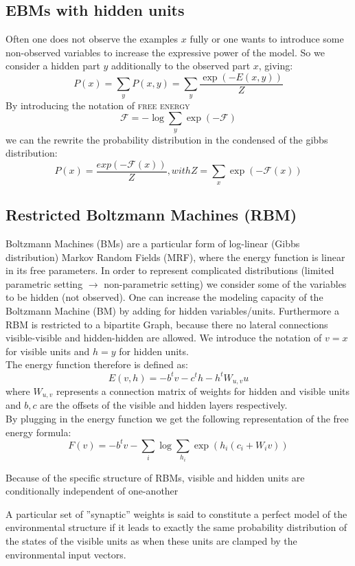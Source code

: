 \documentclass[11pt]{article}
\begin{document}
\subsection{EBMs with hidden units}
Often one does not observe the examples $x$ fully or one wants to introduce some non-observed variables to increase the expressive power of the model. So we consider a hidden part $y$ additionally to the observed part $x$, giving:
\[ 
	P(x) = \sum_y P(x,y) = \sum_y \frac{\exp(-E(x,y))}{Z}
\]
By introducing the notation of \textsc{free energy}
\[
	\mathcal{F}= -\log\sum_y \exp(-\mathcal{F})
\]
we can the rewrite the probability distribution in the condensed of the gibbs distribution:
\[
	P(x)=\frac{exp(-\mathcal{F}(x))}{Z}, with Z=\sum_x \exp(-\mathcal{F}(x))
\]

\subsection{Restricted Boltzmann Machines (RBM)}
Boltzmann Machines (BMs) are a particular form of log-linear (Gibbs distribution) Markov Random Fields (MRF), where the energy function is linear in its free parameters. In order to represent complicated distributions (limited parametric setting $\rightarrow$ non-parametric setting) we consider some of the variables to be hidden (not observed). One can increase the modeling capacity of the Boltzmann Machine (BM) by adding for hidden variables/units. Furthermore a RBM is restricted to a bipartite Graph, because there no lateral connections visible-visible and hidden-hidden are allowed. We introduce the notation of $v=x$ for visible units and $h=y$ for hidden units.\\
The energy function therefore is defined as:
\[
	E(v,h)=-b^{t}v-c^{t}h-h^{t}W_{u,v}u
\]
where $W_{u,v}$ represents a connection matrix of weights for hidden and visible units and $b,c$ are the offsets of the visible and hidden layers respectively.\\
By plugging in the energy function we get the following representation of the free energy formula:\\
\[
	F(v)=-b^{t}v-\sum_i\log\sum_{h_i} \exp(h_i(c_i+W_iv))
\]

Because of the specific structure of RBMs, visible and hidden units are conditionally independent of one-another 

A particular set of ''synaptic'' weights is said to constitute a perfect model of the environmental structure if it leads to exactly the same probability distribution of the states of the visible units as when these units are clamped by the environmental input vectors.
\end{document}
